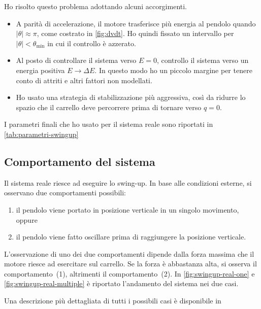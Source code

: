 Ho risolto questo problema adottando alcuni accorgimenti.
\begin{itemize}
    \item A parità di accelerazione, il motore trasferisce più
    energia al pendolo quando $|\theta| \approx \pi$, come costrato
    in \autoref{fig:dvdt}.
    Ho quindi fissato un intervallo per $|\theta| < \theta_{\min} $ in cui il
    controllo è azzerato.

    \item Al posto di controllare il sistema verso $E = 0$,
    controllo il sistema verso un energia positiva $E \to \Delta E$.
    In questo modo ho un piccolo margine per tenere conto di attriti
    e altri fattori non modellati.

    \item Ho usato una strategia di stabilizzazione più aggressiva,
    così da ridurre lo spazio che il carrello deve percorrere prima
    di tornare verso $q = 0$.
\end{itemize}
I parametri finali che ho usato per il sistema reale sono riportati
in \autoref{tab:parametri-swingup}



\subsection{Comportamento del sistema}
Il sistema reale riesce ad eseguire lo swing-up.
In base alle condizioni esterne\footnotemark, si osservano due
comportamenti possibili:
\begin{enumerate}
    \item il pendolo viene portato in posizione verticale in un
    singolo movimento, oppure
    \item il pendolo viene fatto oscillare prima di raggiungere la
    posizione verticale.
\end{enumerate}
L'osservazione di uno dei due comportamenti dipende
dalla forza massima che il motore riesce ad esercitare sul carrello.
Se la forza è abbastanza alta, si osserva il comportamento~(1),
altrimenti il comportamento~(2).
In \autoref{fig:swingup-real-one} e \autoref{fig:swingup-real-multiple}
è riportato l'andamento del sistema nei due casi.

Una descrizione più dettagliata di tutti i possibili casi è disponibile in


